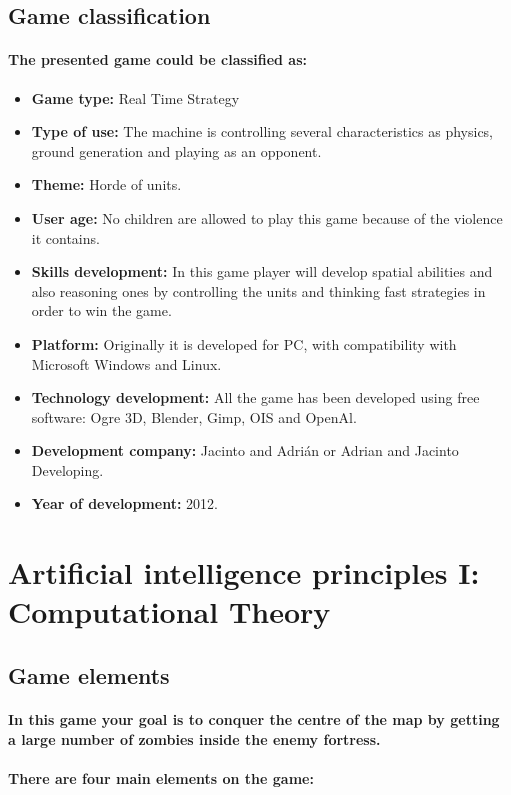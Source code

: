 \documentclass[a4paper,10pt]{article}
\newcommand{\p}[1]{\paragraph{\indent\textnormal{#1}}}
\begin{document}
  \subsection{Game classification}

    \p{The presented game could be classified as:}

    \begin{itemize}
     \item \textbf{Game type:} Real Time Strategy
     \item \textbf{Type of use:} The machine is controlling several characteristics as physics, ground generation and playing as an opponent.
     \item \textbf{Theme:} Horde of units.
     \item \textbf{User age:} No children are allowed to play this game because of the violence it contains.
     \item \textbf{Skills development:} In this game player will develop spatial abilities and also reasoning ones by controlling the units and thinking fast strategies in order to win the game.
     \item \textbf{Platform:} Originally it is developed for PC, with compatibility with Microsoft Windows and Linux.
     \item \textbf{Technology development:} All the game has been developed using free software: Ogre 3D, Blender, Gimp, OIS and OpenAl.
     \item \textbf{Development company:} Jacinto and Adrián or Adrian and Jacinto Developing.
     \item \textbf{Year of development:} 2012.
    \end{itemize}

    

\newpage
\section{Artificial intelligence principles I: Computational Theory}

  \subsection{Game elements}

    \p{In this game your goal is to conquer the centre of the map by getting a large number of zombies inside the enemy fortress.}

    \p{There are four main elements on the game:}
\end{document}
